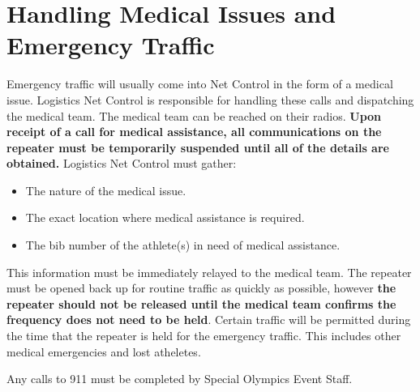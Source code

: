 \documentclass[pdflatex,letterpaper,twoside,12pt]{book}
\begin{document}

\section{Handling Medical Issues and Emergency Traffic}

Emergency traffic will usually come into Net Control in the form of a medical issue.  Logistics Net Control is responsible for handling these calls and dispatching the medical team.  The medical team can be reached on their radios.  \textbf{Upon receipt of a call for medical assistance, all communications on the repeater must be temporarily suspended until all of the details are obtained.}  Logistics Net Control must gather:

\begin{itemize}
	\item The nature of the medical issue.
	\item The exact location where medical assistance is required.
	\item The bib number of the athlete(s) in need of medical assistance.
\end{itemize}

This information must be immediately relayed to the medical team.  The repeater must be opened back up for routine traffic as quickly as possible, however \textbf{the repeater should not be released until the medical team confirms the frequency does not need to be held}.  Certain traffic will be permitted during the time that the repeater is held for the emergency traffic. This includes other medical emergencies and lost atheletes.

Any calls to 911 must be completed by Special Olympics Event Staff.




\iffalse %
We want to change emergencies.. No longer will we hold traffic for nets. We need
to get back to the "Break Break" for emergency traffic, which then we hold only
for the traffic, not until the ER is rectified. We need to work  HARD on getting
Medical onto their own freq. and allowing logistics to handle the ER Dispatch,
etc. We will be having a meeting in January with Leisha and Dave Polaski in
regards. Wold like you to be there also. More to come here as we get closer, but
Were taking control and selling the idea direct to Dave to get his buy in and
push on Dennis. no more Dennis pushing us around. They need to do their job too!
\fi %
\end{document}
